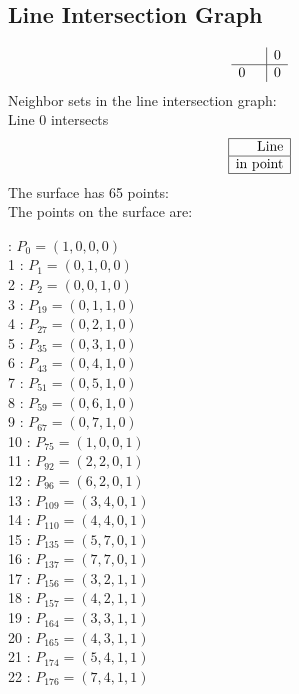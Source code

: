 \documentclass{article}
\begin{document}
{\subsection*{Line Intersection Graph}
{\arraycolsep=1pt
$$
\begin{array}{rr|*{1}r}
 &  & 0\\
\hline
0 &  & 0\\
\end{array}
$$
}%
Neighbor sets in the line intersection graph:\\
Line 0 intersects 
$$
\begin{array}{|r*{0}{|c}|}
\hline
\mbox{Line} \\
\hline
\mbox{in point} \\
\hline
\end{array}
$$
The surface has 65 points:\\
The points on the surface are:\\
\begin{multicols}{3}
 : $P_{0}=( 1, 0, 0, 0 )$\\
1 : $P_{1}=( 0, 1, 0, 0 )$\\
2 : $P_{2}=( 0, 0, 1, 0 )$\\
3 : $P_{19}=( 0, 1, 1, 0 )$\\
4 : $P_{27}=( 0, 2, 1, 0 )$\\
5 : $P_{35}=( 0, 3, 1, 0 )$\\
6 : $P_{43}=( 0, 4, 1, 0 )$\\
7 : $P_{51}=( 0, 5, 1, 0 )$\\
8 : $P_{59}=( 0, 6, 1, 0 )$\\
9 : $P_{67}=( 0, 7, 1, 0 )$\\
10 : $P_{75}=( 1, 0, 0, 1 )$\\
11 : $P_{92}=( 2, 2, 0, 1 )$\\
12 : $P_{96}=( 6, 2, 0, 1 )$\\
13 : $P_{109}=( 3, 4, 0, 1 )$\\
14 : $P_{110}=( 4, 4, 0, 1 )$\\
15 : $P_{135}=( 5, 7, 0, 1 )$\\
16 : $P_{137}=( 7, 7, 0, 1 )$\\
17 : $P_{156}=( 3, 2, 1, 1 )$\\
18 : $P_{157}=( 4, 2, 1, 1 )$\\
19 : $P_{164}=( 3, 3, 1, 1 )$\\
20 : $P_{165}=( 4, 3, 1, 1 )$\\
21 : $P_{174}=( 5, 4, 1, 1 )$\\
22 : $P_{176}=( 7, 4, 1, 1 )$\\

\end{multicols}}
\end{document}
